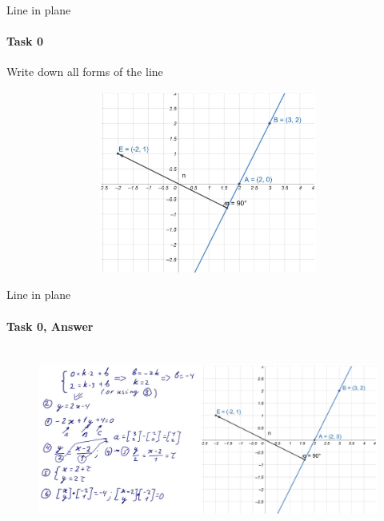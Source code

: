 \documentclass[aspectratio=169]{beamer}
\begin{document}
\begin{frame}[t]{Line in plane}
\framesubtitle{Task 0}
\vspace{-0.6cm}
    \begin{minipage}{0.49\textwidth}
        Write down all forms of the line
    \end{minipage}
    \begin{minipage}{0.5\textwidth}
        \begin{figure}[H]
            \centering\includegraphics[height=6cm,width=1\textwidth,keepaspectratio]{line_in_plane_task.png}
            \label{fig:line_in_plane_task.png}
        \end{figure}
    \end{minipage}
\end{frame}

\begin{frame}[t]{Line in plane}
\framesubtitle{Task 0, Answer}
    \vspace{-0.6cm}
    \begin{figure}[H]
        \centering\includegraphics[height=6cm,width=1\textwidth,keepaspectratio]{line_in_plane_sol.png}
        \label{fig:line_in_plane_sol.png}
    \end{figure}
\end{frame}
\end{document}

